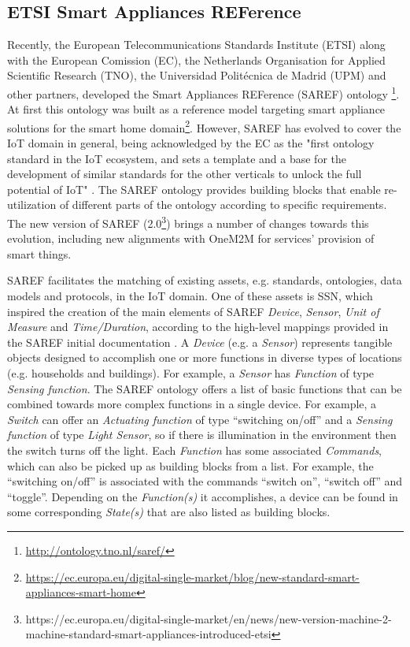 \documentclass{sig-alternate-05-2015}
\begin{document}
\subsection{ETSI Smart Appliances REFerence}
Recently, the European Telecommunications Standards Institute (ETSI) along with the European Comission (EC), the Netherlands Organisation for Applied Scientific Research (TNO), the Universidad Politécnica de Madrid (UPM) and other partners, developed the Smart Appliances REFerence (SAREF) ontology \cite{Daniele2015,Daniele2016}\footnote{\url{http://ontology.tno.nl/saref/}}. At first this ontology was built as a reference model targeting smart appliance solutions for the smart home domain\footnote{\url{https://ec.europa.eu/digital-single-market/blog/new-standard-smart-appliances-smart-home}}. However, SAREF has evolved to cover the IoT domain in general, being acknowledged by the EC as the "first ontology standard in the IoT ecosystem, and sets a template and a base for the development of similar standards for the other verticals to unlock the full potential of IoT" \cite{Daniele2016b}. The SAREF ontology provides building blocks that enable re-utilization of different parts of the ontology according to specific requirements. The new version of SAREF (2.0\footnote{https://ec.europa.eu/digital-single-market/en/news/new-version-machine-2-machine-standard-smart-appliances-introduced-etsi}) brings a number of changes towards this evolution, including new alignments with OneM2M for services' provision of smart things. 

SAREF facilitates the matching of existing assets, e.g. standards, ontologies, data models and protocols, in the IoT domain. One of these assets is SSN, which inspired the creation of the main elements of SAREF  \textit{Device}, \textit{Sensor}, \textit{Unit of Measure} and \textit{Time/Duration}, according to the high-level mappings provided in the SAREF initial documentation \cite{Daniele2015}. A \textit{Device} (e.g. a \textit{Sensor}) represents tangible objects designed to accomplish one or more functions in diverse types of locations (e.g. households and buildings). For example, a \textit{Sensor} has \textit{Function} of type \textit{Sensing function}. The SAREF ontology offers a list of basic functions that can be combined towards more complex functions in a single device. For example, a \textit{Switch} can offer an \textit{Actuating function} of type “switching on/off” and a \textit{Sensing function} of type \textit{Light Sensor}, so if there is illumination in the environment then the switch turns off the light. Each \textit{Function} has some associated \textit{Commands}, which can also be picked up as building blocks from a list. For example, the “switching on/off” is associated with the commands “switch on”, “switch off” and “toggle”. Depending on the \textit{Function(s)} it accomplishes, a device can be found in some corresponding \textit{State(s)} that are also listed as building blocks. 
\end{document}
